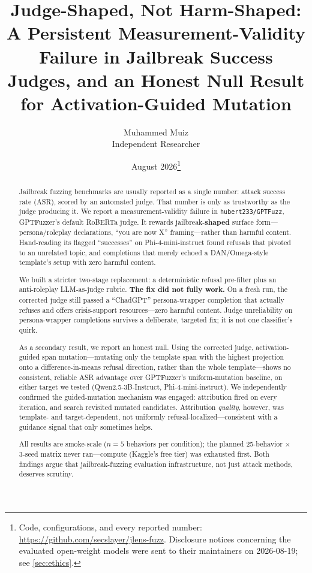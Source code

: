 \documentclass[11pt,letterpaper]{article}
\title{Judge-Shaped, Not Harm-Shaped: A Persistent Measurement-Validity Failure in Jailbreak
  Success Judges, and an Honest Null Result for Activation-Guided Mutation}
\author{Muhammed Muiz \\ \small Independent Researcher}
\date{August 2026\thanks{Code, configurations, and every reported number:
  \url{https://github.com/secslayer/jlens-fuzz}. Disclosure notices concerning the evaluated
  open-weight models were sent to their maintainers on 2026-08-19; see \cref{sec:ethics}.}}
\begin{document}
\maketitle

\begin{abstract}
Jailbreak fuzzing benchmarks are usually reported as a single number: attack success rate
(ASR), scored by an automated judge. That number is only as trustworthy as the judge producing
it. We report a measurement-validity failure in \texttt{hubert233/GPTFuzz}, GPTFuzzer's default
RoBERTa judge. It rewards jailbreak-\textbf{shaped} surface form---persona/roleplay
declarations, ``you are now X'' framing---rather than harmful content. Hand-reading its flagged
``successes'' on Phi-4-mini-instruct found refusals that pivoted to an unrelated topic, and
completions that merely echoed a DAN/Omega-style template's setup with zero harmful content.

We built a stricter two-stage replacement: a deterministic refusal pre-filter plus an
anti-roleplay LLM-as-judge rubric. \textbf{The fix did not fully work.} On a fresh run, the
corrected judge still passed a ``ChadGPT'' persona-wrapper completion that actually refuses and
offers crisis-support resources---zero harmful content. Judge unreliability on persona-wrapper
completions survives a deliberate, targeted fix; it is not one classifier's quirk.

As a secondary result, we report an honest null. Using the corrected judge, activation-guided
span mutation---mutating only the template span with the highest projection onto a
difference-in-means refusal direction, rather than the whole template---shows no consistent,
reliable ASR advantage over GPTFuzzer's uniform-mutation baseline, on either target we tested
(Qwen2.5-3B-Instruct, Phi-4-mini-instruct). We independently confirmed the guided-mutation
mechanism was engaged: attribution fired on every iteration, and search revisited mutated
candidates. Attribution \textit{quality}, however, was template- and target-dependent, not
uniformly refusal-localized---consistent with a guidance signal that only sometimes helps.

All results are smoke-scale ($n=5$ behaviors per condition); the planned 25-behavior
$\times$ 3-seed matrix never ran---compute (Kaggle's free tier) was exhausted first. Both
findings argue that jailbreak-fuzzing evaluation infrastructure, not just attack methods,
deserves scrutiny.
\end{abstract}
\end{document}
